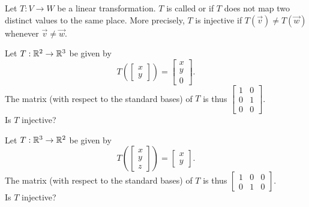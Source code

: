 
\begin{applicationActivities}{2}{18}

\begin{definition}
Let $T: V \rightarrow W$ be a linear transformation.
$T$ is called  or  if $T$ does not map two distinct values to the same place.  More precisely, $T$ is injective if $T(\vec{v}) \neq T(\vec{w})$ whenever $\vec{v} \neq \vec{w}$.
\end{definition}

\begin{activity}{5}
Let $T: \mathbb{R}^2 \rightarrow \mathbb{R}^3$ be given by $$T\left(\begin{bmatrix}x \\ y \end{bmatrix} \right) = \begin{bmatrix} x \\ y \\ 0 \end{bmatrix}.$$
The matrix (with respect to the standard bases) of $T$ is thus $\begin{bmatrix} 1 & 0 \\ 0 & 1 \\ 0 & 0 \end{bmatrix}$. \\
Is $T$ injective?
\end{activity}

\begin{activity}{5}
Let $T: \mathbb{R}^3 \rightarrow \mathbb{R}^2$ be given by $$T\left(\begin{bmatrix} x \\ y \\ z \end{bmatrix} \right) = \begin{bmatrix} x \\ y \end{bmatrix}.$$  The matrix (with respect to the standard bases) of $T$ is thus $\begin{bmatrix} 1 & 0 &0  \\ 0 & 1 & 0 \end{bmatrix}$.\\
Is $T$ injective?
\end{activity}


\end{applicationActivities}
